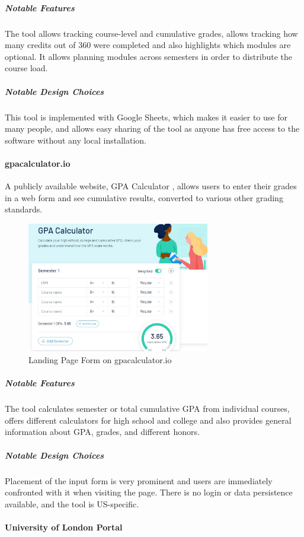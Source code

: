 \subparagraph{Notable Features}
The tool allows tracking course-level and cumulative grades, allows tracking how many credits out of 360 were completed and also highlights which modules are optional. It allows planning modules across semesters in order to distribute the course load.

\subparagraph{Notable Design Choices}
This tool is implemented with Google Sheets, which makes it easier to use for many people, and allows easy sharing of the tool as anyone has free access to the software without any local installation.

\paragraph{gpacalculator.io}

A publicly available website, GPA Calculator \cite{gpa_calculator}, allows users to enter their grades in a web form and see cumulative results, converted to various other grading standards.

\begin{figure}[H] 
\noindent \includegraphics[width=8cm]{gpa-calculator-io}
\centering
\caption{Landing Page Form on gpacalculator.io}
\label{fig:gpa-calc}
\end{figure}
\medskip

\subparagraph{Notable Features}
The tool calculates semester or total cumulative GPA from individual courses, offers different calculators for high school and college and also provides general information about GPA, grades, and different honors.

\subparagraph{Notable Design Choices}
Placement of the input form is very prominent and users are immediately confronted with it when visiting the page. There is no login or data persistence available, and the tool is US-specific.

\paragraph{University of London Portal}

